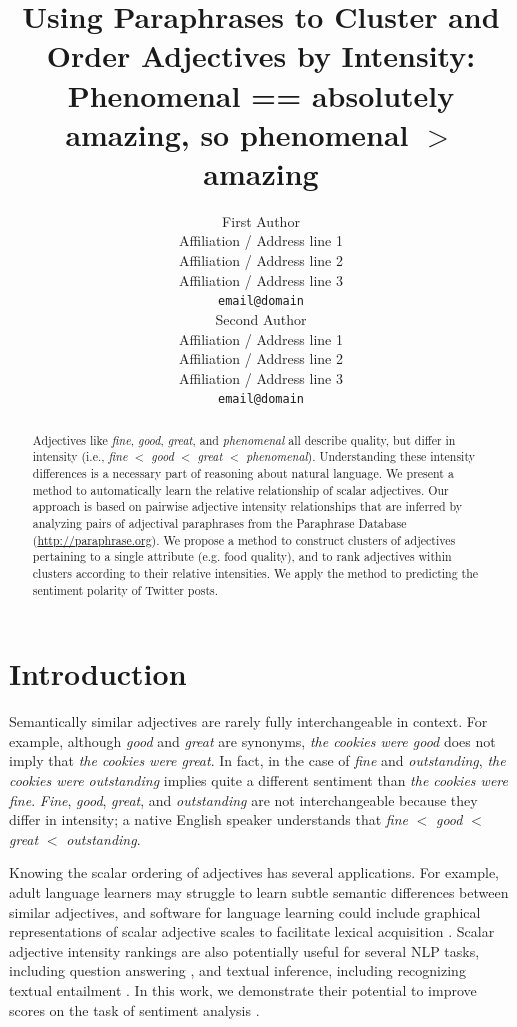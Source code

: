 \documentclass[11pt,a4paper]{article}
\title{Using Paraphrases to Cluster and Order Adjectives by Intensity:\textbf{}\\Phenomenal == absolutely amazing, so phenomenal $>$ amazing}
\author{First Author \\
  Affiliation / Address line 1 \\
  Affiliation / Address line 2 \\
  Affiliation / Address line 3 \\
  {\tt email@domain} \\\And
  Second Author \\
  Affiliation / Address line 1 \\
  Affiliation / Address line 2 \\
  Affiliation / Address line 3 \\
  {\tt email@domain} \\}
\date{}
\begin{document}
\maketitle
\begin{abstract}
Adjectives like {\it fine}, {\it good}, {\it great}, and {\it phenomenal} all describe quality, but differ in intensity (i.e., {\it fine} $<$ {\it good} $<$ {\it great} $<$ {\it phenomenal}). Understanding these intensity differences is a necessary part of reasoning about natural language. We present a method to automatically learn the relative relationship of scalar adjectives. Our approach is based on pairwise adjective intensity relationships that are inferred by analyzing pairs of adjectival paraphrases from the Paraphrase Database (\href{http://paraphrase.org}{http://paraphrase.org}). We propose a method to construct clusters of adjectives pertaining to a single attribute (e.g. food quality), and to rank adjectives within clusters according to their relative intensities. We apply the method to predicting the sentiment polarity of Twitter posts.
\end{abstract}

\section{Introduction}

Semantically similar adjectives are rarely fully interchangeable in context. For example, although \textit{good} and \textit{great} are synonyms, \textit{the cookies were good} does not imply that \textit{the cookies were great}. In fact, in the case of \textit{fine} and \textit{outstanding}, \textit{the cookies were outstanding} implies quite a different sentiment than \textit{the cookies were fine}. \textit{Fine}, \textit{good}, \textit{great}, and \textit{outstanding} are not interchangeable because they differ in intensity; a native English speaker understands that \textit{fine} $<$ \textit{good} $<$ \textit{great} $<$ \textit{outstanding}.

Knowing the scalar ordering of adjectives has several applications. For example, adult language learners may struggle to learn subtle semantic differences between similar adjectives, and software for language learning could include graphical representations of scalar adjective scales to facilitate lexical acquisition \cite{sheinman2013large}. Scalar adjective intensity rankings are also potentially useful for several NLP tasks, including question answering \cite{demarneffe:10}, and textual inference, including recognizing textual entailment \cite{Dagan2006}. In this work, we demonstrate their potential to improve scores on the task of sentiment analysis \cite{Pang:2008:OMS:1454711.1454712}. 
\end{document}
